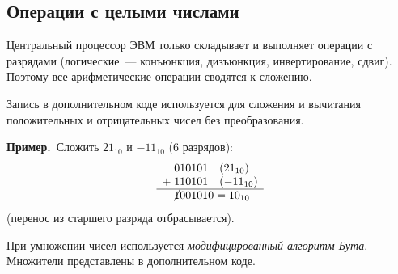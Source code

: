 \documentclass[a4paper,11pt]{article}
\newcommand{\prim}{\textbf{Пример.}\ }
\begin{document}
\subsection{Операции с целыми числами}

Центральный процессор ЭВМ только складывает и выполняет операции с разрядами (логические~---
конъюнкция, дизъюнкция, инвертирование, сдвиг). Поэтому все арифметические операции сводятся
к сложению.

Запись в дополнительном коде используется для сложения и вычитания положительных и отрицательных
чисел без преобразования.

\prim Сложить $21_{10}$ и $-11_{10}$ (6 разрядов):
\[
  \begin{array}{r@{\;}l}
     & 010101 \quad (21_{10}) \\
    + & 110101 \quad (-11_{10}) \\ \hline
     & \cancel{1}001010 = 10_{10}
  \end{array}
\]
(перенос из старшего разряда отбрасывается).

При умножении чисел используется \emph{модифицированный алгоритм Бута}. Множители
представлены в дополнительном коде.
\end{document}
